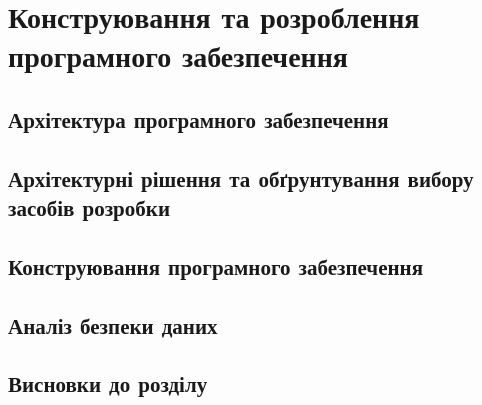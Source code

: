 \section{Конструювання та розроблення програмного забезпечення}

\subsection{Архітектура програмного забезпечення}

\subsection{Архітектурні рішення та обґрунтування вибору засобів розробки}

\subsection{Конструювання програмного забезпечення}

\subsection{Аналіз безпеки даних}

\subsection{Висновки до розділу}
